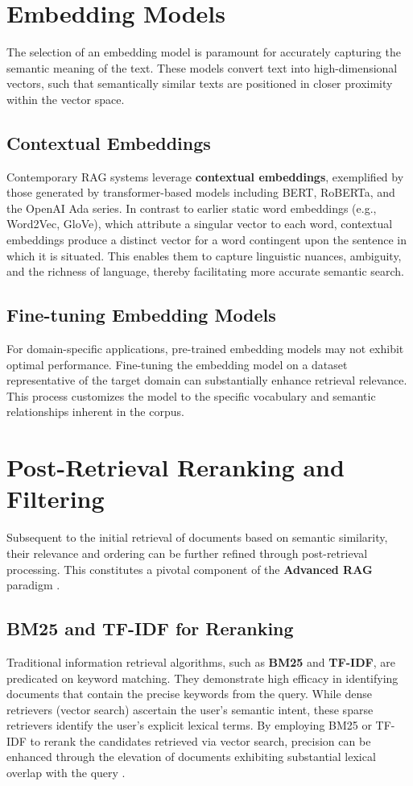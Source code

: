\section{Embedding Models}
The selection of an embedding model is paramount for accurately capturing the semantic meaning of the text. These models convert text into high-dimensional vectors, such that semantically similar texts are positioned in closer proximity within the vector space.

\subsection{Contextual Embeddings}
Contemporary RAG systems leverage \textbf{contextual embeddings}, exemplified by those generated by transformer-based models including BERT, RoBERTa, and the OpenAI Ada series. In contrast to earlier static word embeddings (e.g., Word2Vec, GloVe), which attribute a singular vector to each word, contextual embeddings produce a distinct vector for a word contingent upon the sentence in which it is situated. This enables them to capture linguistic nuances, ambiguity, and the richness of language, thereby facilitating more accurate semantic search.

\subsection{Fine-tuning Embedding Models}
For domain-specific applications, pre-trained embedding models may not exhibit optimal performance. Fine-tuning the embedding model on a dataset representative of the target domain can substantially enhance retrieval relevance. This process customizes the model to the specific vocabulary and semantic relationships inherent in the corpus.

\section{Post-Retrieval Reranking and Filtering}
Subsequent to the initial retrieval of documents based on semantic similarity, their relevance and ordering can be further refined through post-retrieval processing. This constitutes a pivotal component of the \textbf{Advanced RAG} paradigm \autocite{gao2024retrievalaugmented}.

\subsection{BM25 and TF-IDF for Reranking}
Traditional information retrieval algorithms, such as \textbf{BM25} and \textbf{TF-IDF}, are predicated on keyword matching. They demonstrate high efficacy in identifying documents that contain the precise keywords from the query. While dense retrievers (vector search) ascertain the user's semantic intent, these sparse retrievers identify the user's explicit lexical terms. By employing BM25 or TF-IDF to rerank the candidates retrieved via vector search, precision can be enhanced through the elevation of documents exhibiting substantial lexical overlap with the query \autocite{gao2024retrievalaugmented}.

